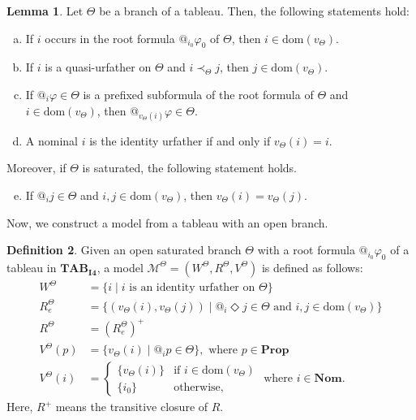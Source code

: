 \documentclass{article}
\theoremstyle{definition}
\newtheorem{definition}{Definition}[section]
\newtheorem{lemma}[definition]{Lemma}
\newcommand{\Prop}{\mathbf{Prop}}
\newcommand{\Nom}{\mathbf{Nom}}
\newcommand{\Dia}{\Diamond}
\newcommand{\Kmodel}{\mathcal{M}}
\newcommand{\dom}{\mathrm{dom}}
\newcommand{\tableauIF}{\mathbf{TAB}_{\mathbf{I4}}}
\begin{document}
\begin{lemma}
    Let $\Theta$ be a branch of a tableau. Then, the following statements hold:
    \begin{enumerate}[(a)]
        \item If $i$ occurs in the root formula $@_{i_0} \varphi_0$ of $\Theta$, then $i \in \dom(v_\Theta)$. \label{lemrightiur} 
        \item If $i$ is a quasi-urfather on $\Theta$ and $i \prec_\Theta j$, then $j \in \dom(v_\Theta)$. \label{lemiursucc}
        \item If $@_i \varphi \in \Theta$ is a prefixed subformula of the root formula of $\Theta$ and $i \in \dom(v_\Theta)$, then $@_{v_\Theta(i)} \varphi \in \Theta$. \label{lemiurcl}
        \item A nominal $i$ is the identity urfather if and only if $v_\Theta(i) = i$. \label{lemiurid}
    \end{enumerate}
    Moreover, if $\Theta$ is saturated, the following statement holds.
    \begin{enumerate}[(a)]
        \setcounter{enumi}{4}
        \item If $@_i j \in \Theta$ and $i, j \in \dom(v_\Theta)$, then $v_\Theta(i) = v_\Theta(j)$. \label{lemiureq}
    \end{enumerate}
    \label{lempropiur}
\end{lemma}

Now, we construct a model from a tableau with an open branch.   

\begin{definition}
    Given an open saturated branch $\Theta$ with a root formula $@_{i_0} \varphi_0$ of a tableau in $\tableauIF$, a model $\Kmodel^\Theta = (W^\Theta, R^\Theta, V^\Theta)$ is defined as follows:
    \begin{align*}
        W^\Theta &= \{ i \mid i \text{ is an identity urfather on } \Theta \} \\
        R_e^\Theta &= \{ (v_\Theta(i), v_\Theta(j)) \mid @_i \Dia j \in \Theta \text{ and } i, j \in \dom(v_\Theta) \} \\
        R^\Theta &= (R_e^\Theta)^+ \\
        V^\Theta(p) &= \{ v_\Theta(i) \mid @_i p \in \Theta \},\text{ where } p \in \Prop \\
        V^\Theta(i) &=
        \begin{cases}
            \{ v_\Theta(i) \} & \text{if } i \in \dom(v_\Theta) \\
            \{ i_0 \} & \text{otherwise,}
        \end{cases}
        \text{ where } i \in \Nom.
    \end{align*}
    Here, $R^+$ means the transitive closure of $R$.
    \label{defI4tableaumodel}
\end{definition}
\end{document}
